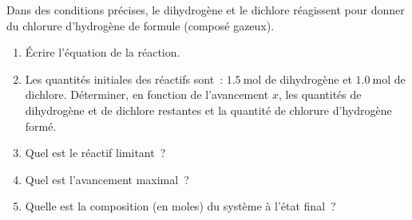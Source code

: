 Dans des conditions précises, le dihydrogène et le dichlore réagissent pour
donner du chlorure d'hydrogène de formule  (composé gazeux).
\begin{enumerate}
    \item Écrire l'équation de la réaction.
    \item Les quantités initiales des réactifs sont~: $\qty{1.5}{\mol}$ de
          dihydrogène et $\qty{1.0}{\mol}$ de dichlore. Déterminer, en fonction
          de l'avancement $x$, les quantités de dihydrogène et de dichlore
          restantes et la quantité de chlorure d'hydrogène formé.
    \item Quel est le réactif limitant~?
    \item Quel est l'avancement maximal~?
    \item Quelle est la composition (en moles) du système à l'état final~?
\end{enumerate}

